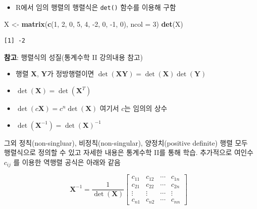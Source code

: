 \documentclass[
  11pt,
]{krantz}
\newenvironment{Shaded}{\begin{snugshade}}{\end{snugshade}}
\newcommand{\DataTypeTok}[1]{\textcolor[rgb]{0.27,0.27,0.27}{#1}}
\newcommand{\DecValTok}[1]{\textcolor[rgb]{0.06,0.06,0.06}{#1}}
\newcommand{\KeywordTok}[1]{\textcolor[rgb]{0.27,0.27,0.27}{\textbf{#1}}}
\newcommand{\NormalTok}[1]{#1}
\newcommand{\StringTok}[1]{\textcolor[rgb]{0.5,0.5,0.5}{#1}}
\providecommand{\tightlist}{%
  \setlength{\itemsep}{0pt}\setlength{\parskip}{0pt}}
\let\BeginKnitrBlock\begin \let\EndKnitrBlock\end
\begin{document}
\begin{itemize}
\tightlist
\item
  R에서 임의 행렬의 행렬식은 \texttt{det()} 함수를 이용해 구함
\end{itemize}

\footnotesize

\begin{Shaded}
\begin{Highlighting}[]
\NormalTok{X <-}\StringTok{ }\KeywordTok{matrix}\NormalTok{(}\KeywordTok{c}\NormalTok{(}\DecValTok{1}\NormalTok{, }\DecValTok{2}\NormalTok{, }\DecValTok{0}\NormalTok{, }\DecValTok{5}\NormalTok{, }\DecValTok{4}\NormalTok{, }\DecValTok{-2}\NormalTok{, }\DecValTok{0}\NormalTok{, }\DecValTok{-1}\NormalTok{, }\DecValTok{0}\NormalTok{), }\DataTypeTok{ncol =} \DecValTok{3}\NormalTok{)}
\KeywordTok{det}\NormalTok{(X)}
\end{Highlighting}
\end{Shaded}

\begin{verbatim}
[1] -2
\end{verbatim}

\normalsize

\footnotesize

\BeginKnitrBlock{rmdtip}
\textbf{참고}: 행렬식의 성질(통계수학 II 강의내용 참고)

\begin{itemize}
\tightlist
\item
  행렬 \(\mathrm{\mathbf{X}}\), \(\mathrm{\mathbf{Y}}\)가 정방행렬이면 \(\det(\mathrm{\mathbf{XY}}) = \det(\mathrm{\mathbf{X}})\det(\mathrm{\mathbf{Y}})\)
\item
  \(\det(\mathrm{\mathbf{X}}) = \det(\mathrm{\mathbf{X}}^T)\)
\item
  \(\det(c\mathrm{\mathbf{X}}) = c^n \det(\mathrm{\mathbf{X}})\) 여기서 \(c\)는 임의의 상수
\item
  \(\det(\mathrm{\mathbf{X}}^{-1}) = \det(\mathrm{\mathbf{X}})^{-1}\)
\end{itemize}

그외 정칙(non-singluar), 비정칙(non-singular), 양정치(positive definite) 행렬 모두 행렬식으로 정의할 수 있고 자세한 내용은 통계수학 II를 통해 학습. 추가적으로 여인수 \(c_{ij}\) 를 이용한 역행렬 공식은 아래와 같음

\[\mathrm{\mathbf{X}}^{-1} = \frac{1}{\det(\mathrm{\mathbf{X}})}
\begin{bmatrix}
c_{11} & c_{12} &  \cdots & c_{1n} \\
c_{21} & c_{22} &  \cdots & c_{2n} \\
\vdots & \vdots & \cdots & \vdots \\
c_{n1} & c_{n2}  & \cdots & c_{nn}
\end{bmatrix}
\]
\EndKnitrBlock{rmdtip}
\end{document}
